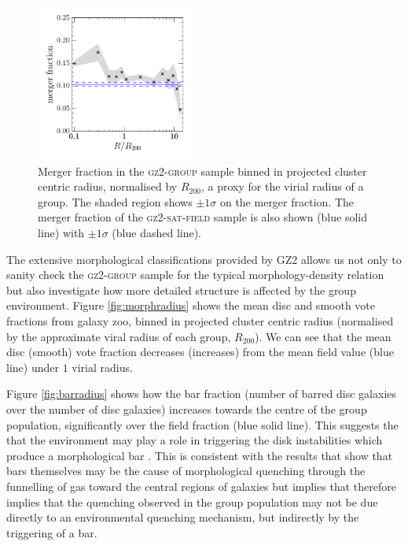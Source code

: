 \documentclass[useAMS,usenatbib]{mn2e}
\begin{document}
\begin{figure}
\includegraphics[width=0.46\textwidth]{merger_fraction_trend_with_log_radius_compare_sat_field_cand.pdf}
\caption{Merger fraction in the \textsc{gz2-group} sample binned in projected cluster centric radius, normalised by $R_{200}$, a proxy for the virial radius of a group. The shaded region shows $\pm1\sigma$ on the merger fraction. The merger fraction of the \textsc{gz2-sat-field} sample is also shown (blue solid line) with $\pm1\sigma$ (blue dashed line).}
\label{fig:mergerradius}
\end{figure}

The extensive morphological classifications provided by GZ2 allows us not only to sanity check the \textsc{gz2-group} sample for the typical morphology-density relation \citep{dressler80} but also investigate how more detailed structure is affected by the group environment.  Figure \ref{fig:morphradius} shows the mean disc and smooth vote fractions from galaxy zoo, binned in projected cluster centric radius (normalised by the approximate viral radius of each group, $R_{200}$). We can see that the mean disc (smooth) vote fraction decreases (increases) from the mean field value (blue line) under $1$ virial radius.

Figure \ref{fig:barradius} shows how the bar fraction (number of barred disc galaxies over the number of disc galaxies) increases towards the centre of the group population, significantly over the field fraction (blue solid line). This suggests the that the environment may play a role in triggering the disk instabilities which produce a morphological bar \citep{ref, ref, ref}. This is consistent with the results that show that bars themselves may be the cause of morphological quenching through the funnelling of gas toward the central regions of galaxies \citep{} but implies that therefore implies that the quenching observed in the group population may not be due directly to an environmental quenching mechanism, but indirectly by the triggering of a bar. 
\end{document}
